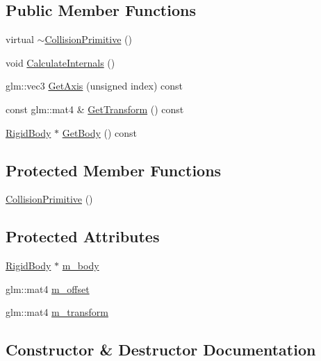 \subsection*{Public Member Functions}
\begin{DoxyCompactItemize}
\item 
virtual \hyperlink{classrum_1_1_collision_primitive_aaaa286303df8a1af561d698b4bb9f098}{$\sim$\+Collision\+Primitive} ()
\item 
void \hyperlink{classrum_1_1_collision_primitive_ac5305895140134e0bcfd01d1147137ed}{Calculate\+Internals} ()
\item 
glm\+::vec3 \hyperlink{classrum_1_1_collision_primitive_a30278cfc1972f7836e3eba690737dcaa}{Get\+Axis} (unsigned index) const
\item 
const glm\+::mat4 \& \hyperlink{classrum_1_1_collision_primitive_afc3a26773be21960585f83f042e322c6}{Get\+Transform} () const
\item 
\hyperlink{classrum_1_1_rigid_body}{Rigid\+Body} $\ast$ \hyperlink{classrum_1_1_collision_primitive_a6f862927f815a26f16606960824cc191}{Get\+Body} () const
\end{DoxyCompactItemize}
\subsection*{Protected Member Functions}
\begin{DoxyCompactItemize}
\item 
\hyperlink{classrum_1_1_collision_primitive_af314a601d4528bc79710e9e7d9d0413e}{Collision\+Primitive} ()
\end{DoxyCompactItemize}
\subsection*{Protected Attributes}
\begin{DoxyCompactItemize}
\item 
\hyperlink{classrum_1_1_rigid_body}{Rigid\+Body} $\ast$ \hyperlink{classrum_1_1_collision_primitive_a9ef6e9862ac5e75330395368e401530e}{m\+\_\+body}
\item 
glm\+::mat4 \hyperlink{classrum_1_1_collision_primitive_a1617f197d7dbf54801bb21fbcedf730e}{m\+\_\+offset}
\item 
glm\+::mat4 \hyperlink{classrum_1_1_collision_primitive_a17dea68b6d2faa8573935fbaf4e81440}{m\+\_\+transform}
\end{DoxyCompactItemize}


\subsection{Constructor \& Destructor Documentation}
\mbox{\label{classrum_1_1_collision_primitive_aaaa286303df8a1af561d698b4bb9f098}} 
